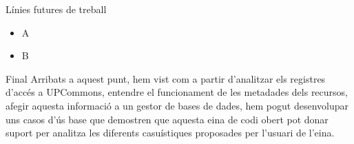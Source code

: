 \begin{frame}{Línies futures de treball}

    \begin{itemize}
        \item A
        \item B
    \end{itemize}

\end{frame}

\begin{frame}{Final}
    Arribats a aquest punt, hem vist com a partir d’analitzar els registres d’accés a UPCommons, entendre el funcionament de les metadades dels recursos, afegir aquesta informació a un gestor de bases de dades, hem pogut desenvolupar uns casos d’ús base que demostren que aquesta eina de codi obert pot donar suport per analitza les diferents casuístiques proposades per l’usuari de l’eina.
\end{frame}
